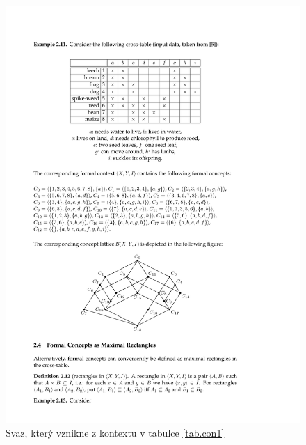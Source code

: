 \documentclass[12pt]{article}
\begin{document}
\begin{figure}
  \centering
  \includegraphics[width=14cm]{obrazky/svaz.pdf}
  \caption{Svaz, který vznikne z kontextu v tabulce \ref{tab.con1}}
  \label{fig.lattice}
\end{figure}
\end{document}
